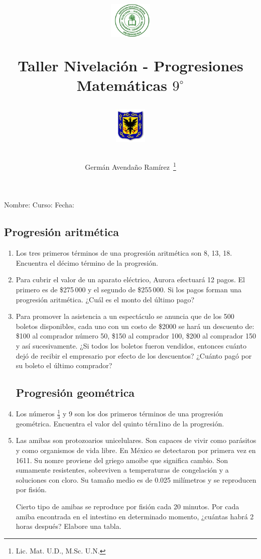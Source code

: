 \documentclass[twoside,letterpaper]{article}
\author{Germ\'an Avenda\~no Ram\'irez~\thanks{Lic. Mat. U.D., M.Sc. U.N.}}
\title{\begin{minipage}{.2\textwidth}
\includegraphics[height=1.75cm]{Images/logo-colegio.png}\end{minipage}
\begin{minipage}{.55\textwidth}
\begin{center}
Taller Nivelación - Progresiones\\
Matemáticas $9^{\circ}$
\end{center}
\end{minipage}\hfill
\begin{minipage}{.2\textwidth}
\includegraphics[height=1.75cm]{Images/logo-sed.png} 
\end{minipage}}
\date{}
\begin{document}
\maketitle
Nombre: \hrulefill Curso: \underline{\hspace*{44pt}} Fecha: \underline{\hspace*{2.5cm}}
\begin{multicols}{2}
\section*{Progresión aritmética}
\begin{enumerate}
\item Los tres primeros términos de una progresión aritmética son 8, 13, 18. Encuentra el décimo término de la progresión.
\item Para cubrir el valor de un aparato eléctrico, Aurora efectuará 12 pagos. El primero es de \$275\,000 y el segundo de \$255\,000. Si los pagos forman una progresión aritmética. ¿Cuál es el monto del último pago?
\item Para promover la asistencia a un espectáculo se anuncia que de los 500 boletos disponibles, cada uno con un costo de \$2000 se hará un descuento de: \$100 al comprador número 50, \$150 al comprador 100, \$200 al comprador 150 y así sucesivamente. ¿Si todos los boletos fueron vendidos, entonces cuánto dejó de recibir el empresario por efecto de los descuentos? ¿Cuánto pagó por su boleto el último comprador?
\section*{Progresión geométrica}
\item Los números $\frac{1}{3}$ y 9 son los dos primeros términos de una progresión geométrica. Encuentra el valor del quinto térn1ino de la progresión.
\item Las amibas son protozoarios unicelulares. Son capaces de vivir como parásitos y como organismos de vida libre. En México se detectaron por primera vez en 1611. Su nomre proviene del griego amoibe que significa cambio. Son sumamente resistentes, sobreviven a temperaturas de congelación y a soluciones con cloro. Su tamaño medio es de 0.025 milímetros y se reproducen por fisión.

Cierto tipo de amibas se reproduce por fisión cada 20 minutos. Por cada amiba encontrada en el intestino en determinado momento, ¿cuántas habrá 2 horas después? Elabore una tabla.
\end{enumerate}
\end{multicols}
\end{document}
